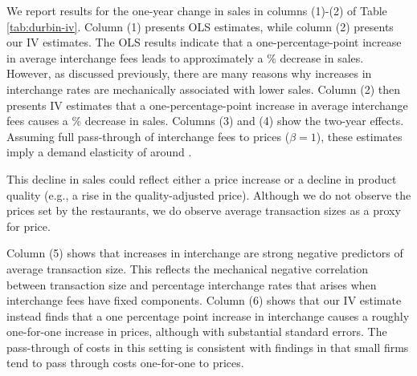 \documentclass[main.tex]{subfiles}
\begin{document}
We report results for the one-year change in sales in columns (1)-(2) of Table \ref{tab:durbin-iv}.
Column (1) presents OLS estimates, while column (2) presents our IV estimates.
The OLS results indicate that a one-percentage-point increase in average interchange fees leads to approximately a \% decrease in sales.
However, as discussed previously, there are many reasons why increases in interchange rates are mechanically associated with lower sales.
Column (2) then presents IV estimates that a one-percentage-point increase in average interchange fees causes a \% decrease in sales.
Columns (3) and (4) show the two-year effects.
Assuming full pass-through of interchange fees to prices ($\beta = 1$), these estimates imply a demand elasticity of around .


This decline in sales could reflect either a price increase or a decline in product quality (e.g., a rise in the quality-adjusted price).
Although we do not observe the prices set by the restaurants, we do observe average transaction sizes as a proxy for price.

Column (5) shows that increases in interchange are strong negative predictors of average transaction size.
This reflects the mechanical negative correlation between transaction size and percentage interchange rates that arises when interchange fees have fixed components.
Column (6) shows that our IV estimate instead finds that a one percentage point increase in interchange causes a roughly one-for-one increase in prices, although with substantial standard errors.
The pass-through of costs in this setting is consistent with findings in \citet{Amiti.etal2019} that small firms tend to pass through costs one-for-one to prices.

\end{document}
